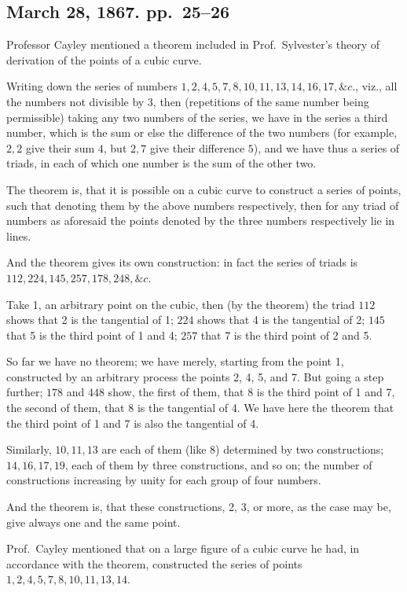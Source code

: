 \documentclass[12pt,a4paper]{article}
\theoremstyle{plain}
\theoremstyle{definition}
\theoremstyle{remark}
\begin{document}
\subsection*{March 28, 1867. pp.~25--26}

Professor Cayley mentioned a theorem included in Prof.~Sylvester's theory of derivation of the points of a cubic curve.

Writing down the series of numbers $1, 2, 4, 5, 7, 8, 10, 11, 13, 14, 16, 17, \&c.$, viz., all the numbers not divisible by 3, then (repetitions of the same number being permissible) taking any two numbers of the series, we have in the series a third number, which is the sum or else the difference of the two numbers (for example, $2, 2$ give their sum $4$, but $2, 7$ give their difference $5$), and we have thus a series of triads, in each of which one number is the sum of the other two.

The theorem is, that it is possible on a cubic curve to construct a series of points, such that denoting them by the above numbers respectively, then for any triad of numbers as aforesaid the points denoted by the three numbers respectively lie in lines.

And the theorem gives its own construction: in fact the series of triads is $112, 224, 145, 257, 178, 248, \&c.$

Take 1, an arbitrary point on the cubic, then (by the theorem) the triad $112$ shows that 2 is the tangential of 1; $224$ shows that 4 is the tangential of 2; $145$ that 5 is the third point of 1 and 4; $257$ that 7 is the third point of 2 and 5.

So far we have no theorem; we have merely, starting from the point 1, constructed by an arbitrary process the points 2, 4, 5, and 7. But going a step further; $178$ and $448$ show, the first of them, that 8 is the third point of 1 and 7, the second of them, that 8 is the tangential of 4. We have here the theorem that the third point of 1 and 7 is also the tangential of 4.

Similarly, $10, 11, 13$ are each of them (like 8) determined by two constructions; $14, 16, 17, 19$, each of them by three constructions, and so on; the number of constructions increasing by unity for each group of four numbers.

And the theorem is, that these constructions, 2, 3, or more, as the case may be, give always one and the same point.

Prof.~Cayley mentioned that on a large figure of a cubic curve he had, in accordance with the theorem, constructed the series of points $1, 2, 4, 5, 7, 8, 10, 11, 13, 14$.
\end{document}
